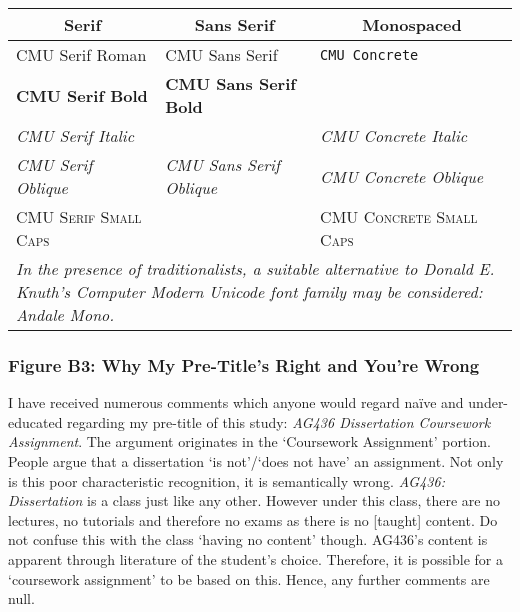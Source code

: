 \documentclass[11pt, english]{article}
\begin{document}
		\begin{table}[h]
			\scriptsize
			\renewcommand{\arraystretch}{1.25}
		\begin{center}
		\begin{tabular}{p{4cm}p{4cm}p{4cm}}
			\hline
			\multicolumn{1}{c}{\textbf{Serif}} & \multicolumn{1}{c}{\textbf{Sans Serif}} & \multicolumn{1}{c}{\textbf{Monospaced}}\\
			\hline
			CMU Serif Roman & \textsf{CMU Sans Serif} & \texttt{CMU Concrete}\\
			\textbf{CMU Serif Bold} & \sffamily \textbf{CMU Sans Serif Bold} & \\ 
				\textit{CMU Serif Italic} & & \ttfamily \textit{CMU Concrete Italic}\\
			\textsl{CMU Serif Oblique} & \sffamily \textsl{CMU Sans Serif Oblique} & \ttfamily \textsl{CMU Concrete Oblique}\\
				\textsc{CMU Serif Small Caps} & & \ttfamily \textsc{CMU Concrete Small Caps}\\
			\hline
				\multicolumn{3}{p{13cm}}{\textit{In the presence of traditionalists, a suitable alternative to Donald E. Knuth's Computer Modern Unicode font family may be considered: Andale Mono.}}\\
			\hline
		\end{tabular}
		\end{center}
		\end{table}

		\subsubsection*{Figure B3: Why My Pre-Title’s Right and You’re Wrong}

		I have received numerous comments which anyone would regard na\"{i}ve and under-educated regarding my pre-title of this study: \textit{AG436 Dissertation Coursework Assignment}. The argument originates in the `Coursework Assignment’ portion. People argue that a dissertation `is not’/`does not have’ an assignment. Not only is this poor characteristic recognition, it is semantically wrong. \textit{AG436: Dissertation} is a class just like any other. However under this class, there are no lectures, no tutorials and therefore no exams as there is no [taught] content. Do not confuse this with the class `having no content’ though. AG436’s content is apparent through literature of the student’s choice. Therefore, it is possible for a `coursework assignment’ to be based on this. Hence, any further comments are null.
\end{document}
